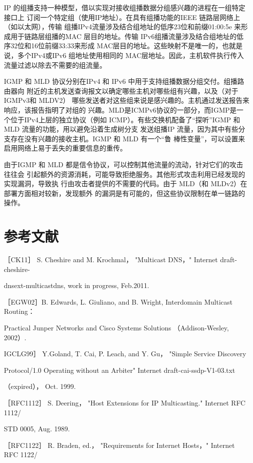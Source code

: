 IP 的组播支持一种模型，借以实现对接收组播数据分组感兴趣的进程在一组特定接口上
订阅一个特定组（使用IP地址）。在具有组播功能的IEEE 链路层网络上（如以太网），传输
组播IPv4流量涉及结合组地址的低序23位和前缀01:00:5e 来形成用于链路层组播的MAC
层目的地址。传输 IPv6组播流量涉及结合组地址的低序32位和16位前缀33:33来形成
MAC层目的地址。这些映射不是唯一的，也就是说，多个IPv4或IPv6 组地址使用相同的
MAC层地址。因此，主机软件执行传入流量过滤以除去不需要的组流量。

IGMP 和 MLD 协议分别在IPv4 和 IPv6 中用于支持组播数据分组交付。组播路由器向
附近的主机发送查询报文以确定哪些主机对哪些组有兴趣，以及（对于 IGMPv3和 MLDV2）
哪些发送者对这些组来说是感兴趣的。主机通过发送报告来响应，该报告指明了对组的
兴趣。MLD是ICMPv6协议的一部分，而IGMP是一个位于IPv4上层的独立协议（例如
ICMP）。有些交换机配备了“探听”IGMP 和 MLD 流量的功能，用以避免沿着生成树分支
发送组播IP 流量，因为其中有些分支存在没有兴趣的接收主机。IGMP 和 MLD 有一个“鲁
棒性变量”，可以设置来启用网络上易于丢失的重要信息的重传。

由于IGMP 和 MLD 都是信令协议，可以控制其他流量的流动，针对它们的攻击往往会
引起额外的资源消耗，可能导致拒绝服务。其他形式攻击利用已经发现的实现漏洞，导致执
行由攻击者提供的不需要的代码。由于 MLD（和 MLDv2）在部署方面相对较新，发现额外
的漏洞是有可能的，但这些协议限制在单一链路的操作。

\section{参考文献}
［CK11］ S. Cheshire and M. Krochmal， "Multicast DNS，" Internet draft-cheshire-

dnsext-multicastdns, work in progress, Feb.2011.

［EGW02］B. Edwards, L. Giuliano, and B. Wright, Interdomain Multicast Routing：

Practical Junper Networks and Cisco Systems Solutions （Addison-Wesley, 2002）.

IGCLG99］ Y.Goland, T. Cai, P. Leach, and Y. Gu， "Simple Service Discovery

Protocol/1.0 Operating without an Arbiter" Internet draft-cai-ssdp-V1-03.txt

（expired）， Oct. 1999.

［RFC1112］ S. Deering， "Host Extensions for IP Multicasting." Internet RFC 1112/

STD 0005, Aug. 1989.

［RFC1122］ R. Braden, ed.， "Requirements for Internet Hosts，" Internet RFC 1122/


